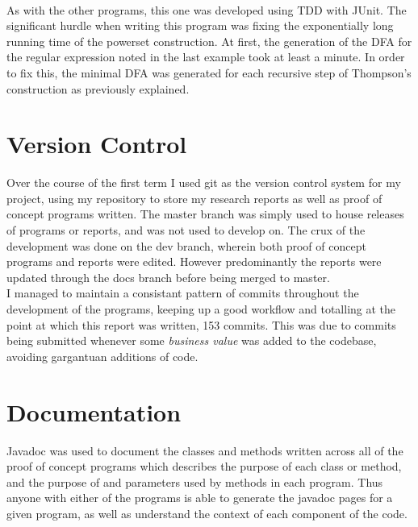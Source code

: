 \documentclass[a4paper, 11pt]{article}
\begin{document}
\\\newline
As with the other programs, this one was developed using TDD with JUnit. The significant hurdle when writing this program was fixing the exponentially long running time of the powerset construction. At first, the generation of the DFA for the regular expression noted in the last example took at least a minute. In order to fix this, the minimal DFA was generated for each recursive step of Thompson's construction as previously explained.
\section{Version Control}
Over the course of the first term I used git as the version control system for my project, using my repository to store my research reports as well as proof of concept programs written. The master branch was simply used to house releases of programs or reports, and was not used to develop on. The crux of the development was done on the dev branch, wherein both proof of concept programs and reports were edited. However predominantly the reports were updated through the docs branch before being merged to master. 
\\\newline
I managed to maintain a consistant pattern of commits throughout the development of the programs, keeping up a good workflow and totalling at the point at which this report was written, 153 commits. This was due to commits being submitted whenever some \textit{business value} was added to the codebase, avoiding gargantuan additions of code.

\section{Documentation}
Javadoc was used to document the classes and methods written across all of the proof of concept programs which describes the purpose of each class or method, and the purpose of and parameters used by methods in each program. Thus anyone with either of the programs is able to generate the javadoc pages for a given program, as well as understand the context of each component of the code.
\end{document}
